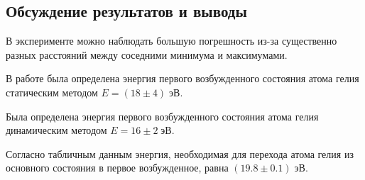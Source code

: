 \documentclass[10pt,a4paper]{article}
\begin{document}
	\subsection*{Обсуждение результатов и выводы}
		
	В эксперименте можно наблюдать большую погрешность из-за существенно разных расстояний между соседними минимума и максимумами.
	
	В работе была определена энергия первого возбужденного состояния атома гелия статическим методом $E = (18 \pm 4) \; эВ$.
	
	Была определена энергия первого возбужденного состояния атома гелия динамическим методом  $E = 16 \pm 2 \; эВ$.
	
	Согласно табличным данным энергия, необходимая для перехода атома гелия из основного состояния в первое возбужденное, равна $(19.8 \pm 0.1) \; эВ$.

	
\end{document}
